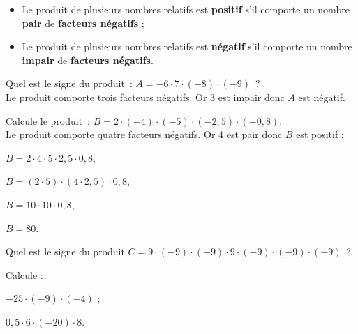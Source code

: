  
 \begin{aconnaitre}
 \begin{itemize}
  \item Le produit de plusieurs nombres relatifs est \textbf{positif} s'il comporte un nombre \textbf{pair} de \textbf{facteurs négatifs} ;
  \item Le produit de plusieurs nombres relatifs est \textbf{négatif} s'il comporte un nombre \textbf{impair} de \textbf{facteurs négatifs}.
  \end{itemize}
\end{aconnaitre}

\begin{methode*1}

 \begin{exemple*1}
Quel est le signe du produit : $A = - 6 \cdot 7 \cdot (- 8) \cdot (- 9)$ ? \\[0.5em]
Le produit comporte trois facteurs négatifs. Or 3 est impair donc $A$ est négatif.
 \end{exemple*1}
 
  \begin{exemple*1}
Calcule le produit : $B = 2 \cdot (- 4) \cdot (- 5) \cdot (- 2,5) \cdot (- 0,8)$. \\[0.5em]
Le produit comporte quatre facteurs négatifs. Or 4 est pair donc $B$ est positif :

$B = 2 \cdot 4 \cdot 5 \cdot 2,5 \cdot 0,8$,
       
$B = (2 \cdot 5) \cdot (4 \cdot 2,5) \cdot 0,8$,
       
$B = 10 \cdot 10 \cdot 0,8$,
       
$B = 80$.
 \end{exemple*1}
 
 \exercice  
Quel est le signe du produit $C = 9 \cdot (- 9) \cdot (- 9) \cdot 9 \cdot (- 9) \cdot (- 9) \cdot (- 9)$ ?
     
 \exercice  
Calcule :
\begin{colenumerate}{2}
 \item $- 25 \cdot (- 9) \cdot (- 4)$ ;
 \item $0,5 \cdot 6 \cdot (- 20) \cdot 8$.
 \end{colenumerate}

 \end{methode*1}
 
 
